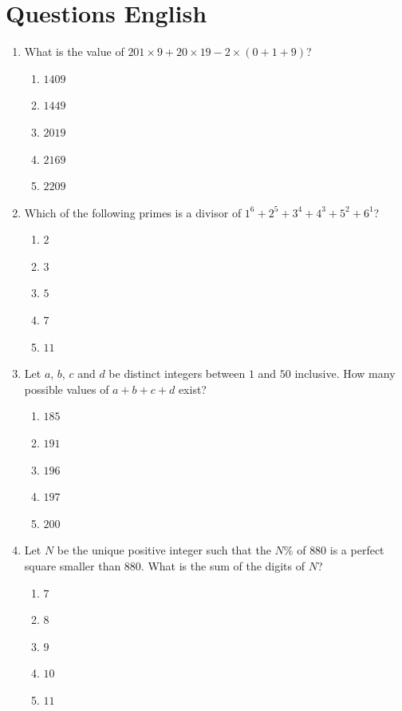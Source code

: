 \documentclass{article}
\begin{document}
\section*{Questions English}

\begin{enumerate}

\item What is the value of $201\times9+20\times19-2\times(0+1+9)$?
\begin{enumerate}
    \item $1409$
    \item $1449$
    \item $2019$
    \item $2169$
    \item $2209$
\end{enumerate}

\item Which of the following primes is a divisor of $1^{6}+2^{5}+3^{4}+4^{3}+5^{2}+6^{1}$?
\begin{enumerate}
    \item $2$
    \item $3$
    \item $5$
    \item $7$
    \item $11$
\end{enumerate}

\item Let $a$, $b$, $c$ and $d$ be distinct integers between $1$ and $50$ inclusive. How many possible values of $a+b+c+d$ exist?
\begin{enumerate}
    \item $185$
    \item $191$
    \item $196$
    \item $197$
    \item $200$
\end{enumerate}

\item Let $N$ be the unique positive integer such that the $N$\% of $880$ is a perfect square smaller than $880$. What is the sum of the digits of $N$?
\begin{enumerate}
    \item $7$
    \item $8$
    \item $9$
    \item $10$
    \item $11$
\end{enumerate}


\end{enumerate}
\end{document}
